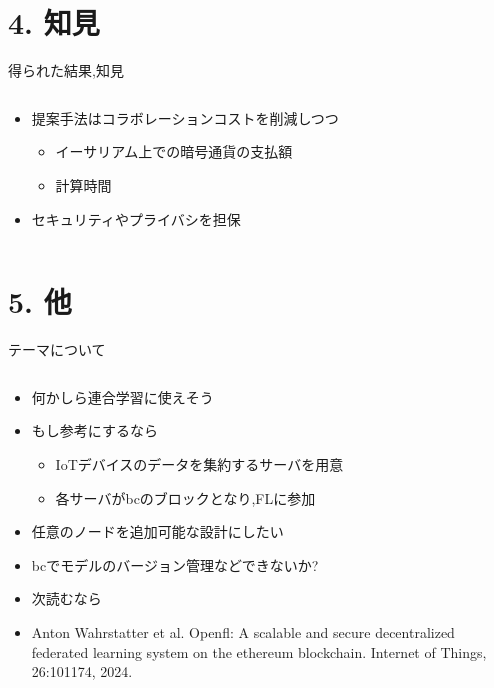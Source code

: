\documentclass[unicode,12pt,aspectratio=169, dvipdfmx]{beamer}
\begin{document}
    \section{4. 知見}
    \begin{frame}{得られた結果,知見}
        \begin{columns}
            \begin{column}{.8\linewidth}
                \begin{itemize}
                   \item 提案手法はコラボレーションコストを削減しつつ
                   \begin{itemize}
                    \item イーサリアム上での暗号通貨の支払額
                    \item 計算時間
                  \end{itemize}  
                  \item セキュリティやプライバシを担保
                \end{itemize}          
            \end{column}
        \end{columns}
    \end{frame}


    \section{5. 他}
    \begin{frame}{テーマについて}
        \begin{columns}
            \begin{column}{.8\linewidth}
                \begin{itemize}
                    \item 何かしら連合学習に使えそう
                    \item もし参考にするなら
                    \begin{itemize}
                        \item IoTデバイスのデータを集約するサーバを用意
                        \item 各サーバがbcのブロックとなり,FLに参加
                    \end{itemize}
                    \item 任意のノードを追加可能な設計にしたい
                    \item bcでモデルのバージョン管理などできないか?
                \item 次読むなら
                \item  Anton Wahrstatter et al. Openfl: A scalable and secure decentralized federated learning system on the ethereum
                blockchain. Internet of Things, 26:101174, 2024.
            \end{itemize}
        \end{column}
        \end{columns}
    \end{frame}
\end{document}
